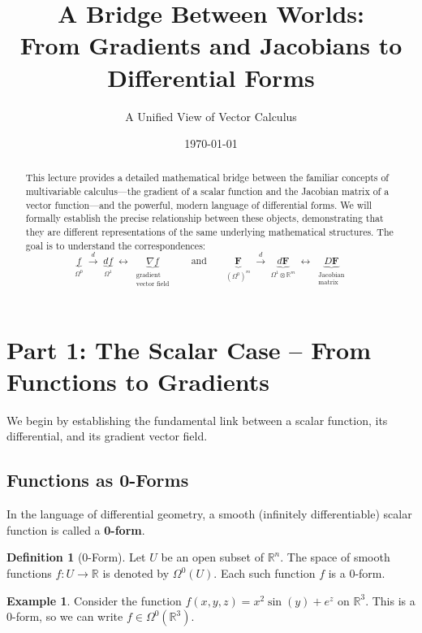 \documentclass[12pt, letterpaper]{article}
\title{\bfseries A Bridge Between Worlds: \\ \large From Gradients and Jacobians to Differential Forms}
\author{A Unified View of Vector Calculus}
\date{\today}
\theoremstyle{definition}
\newtheorem{defn}{Definition}[section]
\newtheorem{exmp}{Example}[section]
\newcommand{\R}{\mathbb{R}}
\begin{document}
	\maketitle
	
	\begin{abstract}
		This lecture provides a detailed mathematical bridge between the familiar concepts of multivariable calculus—the gradient of a scalar function and the Jacobian matrix of a vector function—and the powerful, modern language of differential forms. We will formally establish the precise relationship between these objects, demonstrating that they are different representations of the same underlying mathematical structures. The goal is to understand the correspondences:
		\[
		\underbrace{f}_{\Omega^0}
		\;\xrightarrow{d}\;
		\underbrace{df}_{\Omega^1}
		\;\longleftrightarrow\;
		\underbrace{\nabla f}_{\substack{\text{gradient}\\\text{vector field}}}
		\qquad \text{and} \qquad
		\underbrace{\mathbf F}_{(\Omega^0)^m}
		\;\xrightarrow{d}\;
		\underbrace{d\mathbf F}_{\Omega^1\otimes\R^m}
		\;\longleftrightarrow\;
		\underbrace{D\mathbf F}_{\substack{\text{Jacobian}\\\text{matrix}}}
		\]
	\end{abstract}
	
	\section{Part 1: The Scalar Case -- From Functions to Gradients}
	
	We begin by establishing the fundamental link between a scalar function, its differential, and its gradient vector field.
	
	\subsection{Functions as 0-Forms}
	
	In the language of differential geometry, a smooth (infinitely differentiable) scalar function is called a \textbf{0-form}.
	
	\begin{defn}[0-Form]
		Let $U$ be an open subset of $\mathbb{R}^n$. The space of smooth functions $f: U \to \mathbb{R}$ is denoted by $\Omega^0(U)$. Each such function $f$ is a 0-form.
	\end{defn}
	
	\begin{exmp}
		Consider the function $f(x, y, z) = x^2 \sin(y) + e^z$ on $\mathbb{R}^3$. This is a 0-form, so we can write $f \in \Omega^0(\mathbb{R}^3)$.
	\end{exmp}
	
\end{document}

